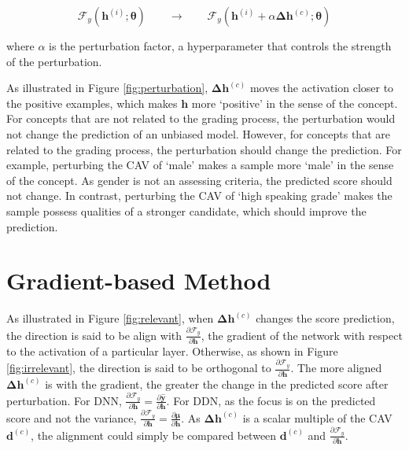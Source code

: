 \begin{equation} \label{eq:add_perturbation}
    \mathcal{F}_{y}(\boldsymbol{h}^{(i)}; \boldsymbol{\theta}) \qquad \rightarrow \qquad \mathcal{F}_{y}(\boldsymbol{h}^{(i)} + \alpha \boldsymbol{\Delta h}^{(c)}; \boldsymbol{\theta})
\end{equation}

where $\alpha$ is the perturbation factor, a hyperparameter that controls the strength of the perturbation.

As illustrated in Figure \ref{fig:perturbation}, $\boldsymbol{\Delta h}^{(c)}$ moves the activation closer to the positive examples, which makes $\boldsymbol{h}$ more `positive' in the sense of the concept. For concepts that are not related to the grading process, the perturbation would not change the prediction of an unbiased model. However, for concepts that are related to the grading process, the perturbation should change the prediction. For example, perturbing the CAV of `male' makes a sample more `male' in the sense of the concept. As gender is not an assessing criteria, the predicted score should not change. In contrast, perturbing the CAV of `high speaking grade' makes the sample possess qualities of a stronger candidate, which should improve the prediction.

\section{Gradient-based Method} \label{sec:gradient}

As illustrated in Figure \ref{fig:relevant}, when $\boldsymbol{\Delta h}^{(c)}$ changes the score prediction, the direction is said to be align with $\frac{\partial \mathcal{F}_y}{\partial \boldsymbol{h}}$, the gradient of the network with respect to the activation of a particular layer.  Otherwise, as shown in Figure \ref{fig:irrelevant}, the direction is said to be orthogonal to $\frac{\partial \mathcal{F}_y}{\partial \boldsymbol{h}}$. The more aligned $\boldsymbol{\Delta h}^{(c)}$ is with the gradient, the greater the change in the predicted score after perturbation. For DNN, $\frac{\partial \mathcal{F}_y}{\partial \boldsymbol{h}} = \frac{\partial \mathbf{\hat{y}}}{\partial \boldsymbol{h}}$. For DDN, as the focus is on the predicted score and not the variance, $\frac{\partial \mathcal{F}_y}{\partial \boldsymbol{h}} = \frac{\partial \mathbf{\mu}}{\partial \boldsymbol{h}}$. As $\boldsymbol{\Delta h}^{(c)}$ is a scalar multiple of the CAV $\boldsymbol{d}^{(c)}$, the alignment could simply be compared between $\boldsymbol{d}^{(c)}$ and $\frac{\partial \mathcal{F}_y}{\partial \boldsymbol{h}}$.

